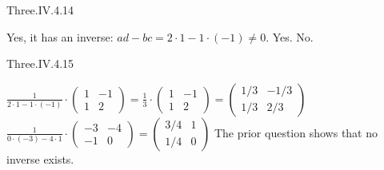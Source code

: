 \begin{ans}{Three.IV.4.14}
      \begin{exparts*}
        \partsitem Yes, it has an inverse: $ad-bc=2\cdot 1-1\cdot(-1)\neq 0$.
        \partsitem Yes.
        \partsitem No.
      \end{exparts*}
    
\end{ans}
\begin{ans}{Three.IV.4.15}
       \begin{exparts}
         \partsitem
           $\displaystyle \frac{1}{2\cdot 1-1\cdot (-1)}
            \cdot\begin{pmatrix}
             1  &-1  \\
             1  &2
           \end{pmatrix}
          =\frac{\displaystyle 1}{\displaystyle 3}\cdot\begin{pmatrix}
             1  &-1  \\
             1  &2
           \end{pmatrix}
          =\begin{pmatrix}
             1/3  &-1/3  \\
             1/3  &2/3
           \end{pmatrix}$
         \partsitem
           $\displaystyle \frac{1}{0\cdot (-3)-4\cdot 1}
           \cdot\begin{pmatrix}
             -3  &-4  \\
             -1  &0
           \end{pmatrix}
           =\begin{pmatrix}
             3/4  &1  \\
             1/4  &0
           \end{pmatrix}$
         \partsitem The prior question shows that no inverse exists.
       \end{exparts}
     
\end{ans}
